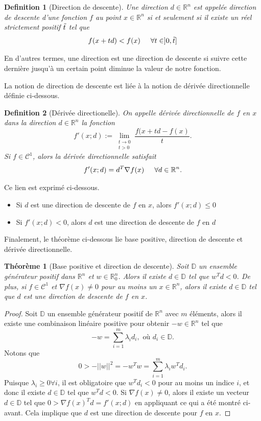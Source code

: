 \documentclass[french]{report}
\newtheorem{thm}{Théorème}[section]
\newtheorem{defn}{Definition}[section]
\newcommand{\theoreme}[2]{\begin{thm}[#1] #2\end{thm}}
\newcommand{\definition}[2]{\begin{defn}[#1] #2 \end{defn}}
\newcommand{\preuve}[1]{\begin{proof} #1 \end{proof}}
\newcommand{\D}{\mathbb{D}}
\begin{document}
\definition{Direction de descente}
{
    Une direction $d \in  \mathbb{R}^n$ est appelée direction de descente d'une fonction $f$ au point $x \in \mathbb{R}^n$ si et seulement si il existe un réel strictement positif $\Tilde{t}$ tel que
    $$
        f(x+td) < f(x) \hspace{0.5cm} \forall t\in ]0,\Tilde{t}]
    $$
}
En d'autres termes, une direction est une direction de descente si suivre cette dernière jusqu'à un certain point diminue la valeur de notre fonction.

La notion de direction de descente est liée à la notion de dérivée directionnelle définie ci-dessous.

\definition{Dérivée directionelle}
{
    On appelle dérivée directionnelle de $f$ en $x$ dans la direction $d \in \mathbb{R}^n$ la fonction
    $$
        f'(x;d):= \lim\limits_{\substack{t \to 0 \\ t>0}}\frac{f(x+td - f(x)}{t}.
    $$
    Si $f \in \mathcal{C}^1$, alors la dérivée directionnelle satisfait
    $$
        f'(x;d) = d^T \nabla f(x) \hspace{0.5cm} \forall d \in \mathbb{R}^n.
    $$
}

Ce lien est exprimé ci-dessous.

\begin{itemize}
    \item Si $d$ est une direction de descente de $f$ en $x$, alors $f'(x;d) \leq 0$
    \item Si $f'(x;d) < 0$, alors $d$ est une direction de descente de $f$ en $d$
\end{itemize}

Finalement, le théorème ci-dessous lie base positive, direction de descente et dérivée directionnelle.

\theoreme{Base positive et direction de descente}
{
    Soit $\D$ un ensemble générateur positif dans $\mathbb{R}^n$ et $w \in \mathbb{R}_0^n$.
    Alors il existe $d \in \D$ tel que $w^T d < 0$. De plus, si $f \in \mathcal{C}^1$ et $\nabla f(x) \neq 0 $ pour au moins un $x \in \mathbb{R}^n$, alors il existe $d \in \D$ tel que $d$ est une direction de descente de $f$ en $x$.
}
\preuve
{
    Soit $\D$ un ensemble générateur positif de $\mathbb{R}^n$ avec $m$ éléments, alors il existe une combinaison linéaire positive pour obtenir $-w \in \mathbb{R}^n$ tel que
    $$
        -w = \sum_{i=1}^m \lambda_i d_i, \text{ où } d_i \in \D.
    $$
    Notons que
    $$
        0 > - ||w||^2 = -w^T w = \sum_{i=1}^m \lambda_i w^T d_i.
    $$
    Puisque $\lambda_i \geq 0 \forall i $, il est obligatoire que $w^T d_i < 0 $ pour au moins un indice $i$, et donc il existe $d \in \D$ tel que $w^T d < 0$.
    Si $\nabla f(x) \neq 0$, alors il existe un vecteur $d \in \D$ tel que $0 > \nabla f(x) ^T d = f'(x;d)$ en appliquant ce qui a été montré ci-avant. Cela implique que $d$ est  une direction de descente pour $f$ en $x$.
}
\end{document}

